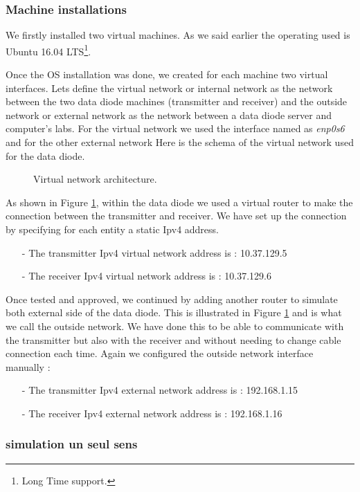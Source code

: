 \documentclass[a4paper,10pt]{article}
\begin{document}
\subsubsection{Machine installations}
We firstly installed two virtual machines. As we said earlier the operating used is Ubuntu 16.04 LTS\footnote{Long Time support.}. 

Once the OS installation was done, we created for each machine two virtual interfaces. Lets define the virtual network or internal network as the network between the two data diode machines (transmitter and receiver) and the outside network or external network as the network between a data diode server and computer's labs. For the virtual network we used the interface named as \emph{enp0s6} and for the other external network Here is the schema of the virtual network used for the data diode. 

\begin{figure}[!h]
\caption{Virtual network architecture.}
\label{fig:netvirt}
\end{figure}

As shown in Figure \ref{fig:netvirt}, within the data diode we used a virtual router to make the connection between the transmitter and receiver. We have set up the connection by specifying for each entity a static Ipv4 address. 
\begin{enumerate}
\item[-] The transmitter Ipv4 virtual network address is : 10.37.129.5
\item[-] The receiver Ipv4 virtual network address is : 10.37.129.6
\end{enumerate}

Once tested and approved, we continued by adding another router to simulate both external side of the data diode. This is illustrated in Figure \ref{fig:netvirt} and is what we call the outside network. We have done this to be able to communicate with the transmitter but also with the receiver and without needing to change cable connection each time. Again we configured the outside network interface manually :
\begin{enumerate}
\item[-] The transmitter Ipv4 external network address is : 192.168.1.15
\item[-] The receiver Ipv4 external network address is : 192.168.1.16
\end{enumerate}
\subsubsection{simulation un seul sens}
\end{document}
